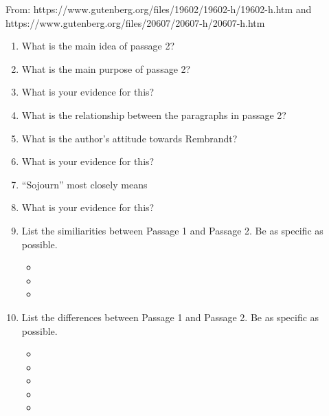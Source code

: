 From: https://www.gutenberg.org/files/19602/19602-h/19602-h.htm and https://www.gutenberg.org/files/20607/20607-h/20607-h.htm

\begin{enumerate}

\item What is the main idea of passage 2? \hrulefill

\item What is the main purpose of passage 2? \hrulefill

\item What is your evidence for this? \hrulefill

\item What is the relationship between the paragraphs in passage 2? \hrulefill

\item What is the author's attitude towards Rembrandt? \hrulefill

\item What is your evidence for this? \hrulefill

\item ``Sojourn'' most closely means \hrulefill

\item What is your evidence for this? \hrulefill

\item List the similiarities between Passage 1 and Passage 2. Be as specific as possible.
\begin{itemize}

\item    

\item    

\item    


 \end{itemize} 
 
 \item List the differences between Passage 1 and Passage 2. Be as specific as possible.
\begin{itemize}

\item    

\item    

\item    

\item    

\item    


\end{itemize}
\end{enumerate}
